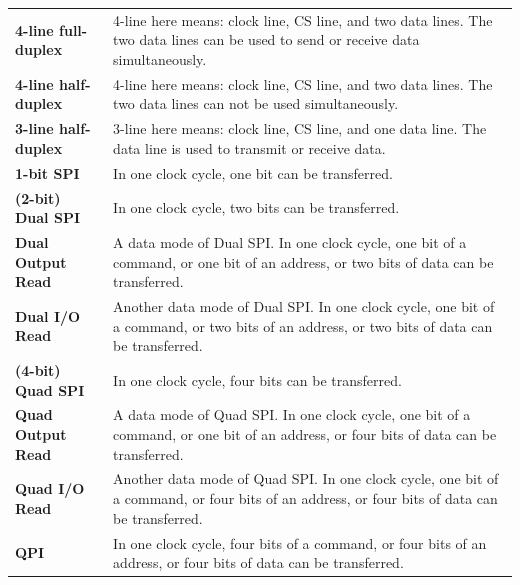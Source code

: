 \begin{longtable}[c]{ R{7cm} p{10cm} }
\textbf{4-line full-duplex} & 4-line here means: clock line, CS line, and two data lines. The two data lines can be used to send or receive data simultaneously.\\
\textbf{4-line half-duplex} & 4-line here means: clock line, CS line, and two data lines. The two data lines can not be used simultaneously.\\
\textbf{3-line half-duplex} & 3-line here means: clock line, CS line, and one data line. The data line is used to transmit or receive data. \\
\textbf{1-bit SPI} & In one clock cycle, one bit can be transferred.\\
\textbf{(2-bit) Dual SPI} & In one clock cycle, two bits can be transferred. \\
\textbf{Dual Output Read} & A data mode of Dual SPI. In one clock cycle, one bit of a command, or one bit of an address, or two bits of data can be transferred.\\
\textbf{Dual I/O Read} & Another data mode of Dual SPI. In one clock cycle, one bit of a command, or two bits of an address, or two bits of data can be transferred.\\
\textbf{(4-bit) Quad SPI} & In one clock cycle, four bits can be transferred. \\
\textbf{Quad Output Read} & A data mode of Quad SPI. In one clock cycle, one bit of a command, or one bit of an address, or four bits of data can be transferred.\\
\textbf{Quad I/O Read} & Another data mode of Quad SPI. In one clock cycle, one bit of a command, or four bits of an address, or four bits of data can be transferred.\\
\textbf{QPI} & In one clock cycle, four bits of a command, or four bits of an address, or four bits of data can be transferred.\\
\end{longtable}